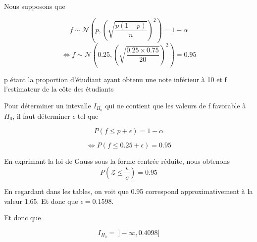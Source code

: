 \documentclass[11pt]{report}
\begin{document}
Nous supposons que

\[ f \sim \mathcal{N}\left(p,\left(\sqrt{\frac{p(1-p)}{n}}\right)^2\right) = 1 - \alpha\]
\[\Leftrightarrow f \sim \mathcal{N}\left(0.25,\left(\sqrt{\frac{0.25\times0.75}{20}}\right)^2\right) = 0.95\]

p étant la proportion d'étudiant ayant obtenu une note inférieur à 10 et f l'estimateur de la côte des étudiants

Pour déterminer un intevalle $I_{H_0}$ qui ne contient que les valeurs de f favorable à $H_0$, il faut déterminer $\epsilon$ tel que 

\[ P\left(f \leq p + \epsilon\right) = 1 - \alpha \]

\[ \Leftrightarrow P\left(f \leq 0.25 + \epsilon\right) = 0.95 \]

En exprimant la loi de Gauss sous la forme centrée réduite, nous obtenons
\[P\left( \mathcal{Z} \leq \frac{\epsilon}{\sigma}\right) = 0.95\]

 En regardant dans les tables, on voit que 0.95 correspond approximativement à la valeur 1.65. Et donc que $\epsilon = 0.1598$.
 
 Et donc que 
 
  \[I_{H_0} = \ ]-\infty, 0.4098] \]
 
 
\end{document}
